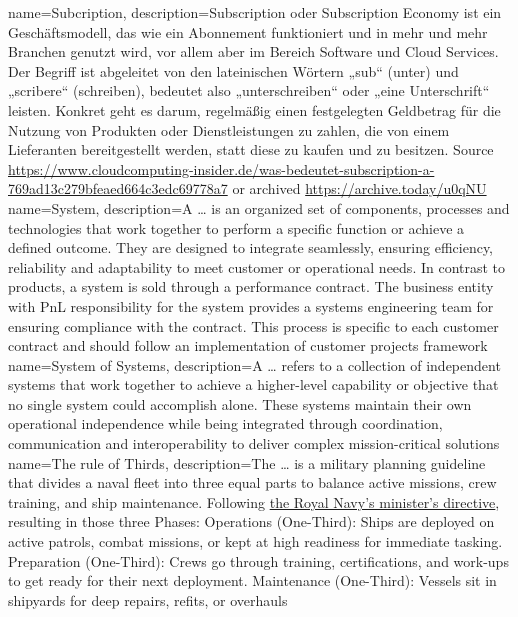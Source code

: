 %
{%
	name=Subcription,%
	description={Subscription oder Subscription Economy ist ein Geschäftsmodell, %
	    das wie ein Abonnement funktioniert und in mehr und mehr Branchen genutzt wird, %
		vor allem aber im Bereich Software und Cloud Services. %
		Der Begriff ist abgeleitet von den lateinischen Wörtern „sub“ (unter) und „scribere“ (schreiben), %
		bedeutet also „unterschreiben“ oder „eine Unterschrift“ leisten. Konkret geht es darum, %
		regelmäßig einen festgelegten Geldbetrag für die Nutzung von Produkten oder Dienstleistungen zu zahlen, %
		die von einem Lieferanten bereitgestellt werden, statt diese zu kaufen und zu besitzen. %
		Source \url{https://www.cloudcomputing-insider.de/was-bedeutet-subscription-a-769ad13c279bfeaed664c3edc69778a7} or archived \url{https://archive.today/u0qNU}%
	}%
}
%
{%
	name=System,%
	description={A \dots{} is an organized set of components, processes and technologies that work together to perform a specific function or achieve a defined outcome. %
		They are designed to integrate seamlessly, ensuring efficiency, reliability and adaptability to meet customer or operational needs. %
		In contrast to products, a system is sold through a performance contract. %
		The business entity with PnL responsibility for the system provides a systems engineering team for ensuring compliance with the contract. %
		This process is specific to each customer contract and should follow an implementation of customer projects framework%
	}%
}
%
{%
	name=System of Systems,%
	description={A \dots{} refers to a collection of independent systems that work together to achieve a higher-level capability or objective that no single system could accomplish alone. %
		These systems maintain their own operational independence while being integrated through coordination, communication and interoperability to deliver complex mission-critical solutions%
	}%
}
%
{%
	name=The rule of Thirds,%
	description={The \dots{} is a military planning guideline that divides a naval fleet into three equal parts to balance active missions, crew training, and ship maintenance.%
	Following \href{https://www.navylookout.com/minister-tells-head-of-the-royal-navy-to-make-increasing-warship-availability-a-priority/}{the Royal Navy's minister's directive}, %
	resulting in those three Phases: %
	Operations (One-Third): Ships are deployed on active patrols, combat missions, or kept at high readiness for immediate tasking. %
	Preparation (One-Third): Crews go through training, certifications, and work-ups to get ready for their next deployment. %
	Maintenance (One-Third): Vessels sit in shipyards for deep repairs, refits, or overhauls%
	}%
}
